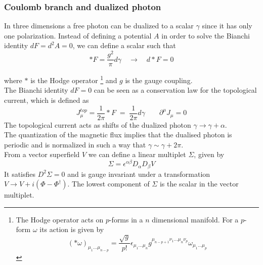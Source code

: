 \subsubsection{Coulomb branch and dualized photon	}

In three dimensions a free photon can be dualized to a scalar $\gamma$ since it has only one polarization.
Instead of defining a potential $A$ in order to solve the Bianchi identity $d F = d^2 A = 0$, we can define a scalar such that
\begin{equation}
  * F = \frac{g^2}{\pi} d  \gamma  \quad \rightarrow \quad d * F  = 0  
\end{equation} 

where 
$*$ is the Hodge operator \footnote{
  The Hodge operator acts on $p$-forms in a $n$ dimensional manifold.
  For a $p$-form $\omega$ its action is given by 
  $$
    ( * \omega)_{\mu_1 \dots \mu_{n-p}} = \frac{\sqrt{g}}{p!} \epsilon_{\mu_1 \dots \mu_n} g^{\mu_{n-p+1} \nu_1 \dots \mu_{n} \nu_p } \omega_{\mu_1 \dots \mu_p}
  $$
}
and 
$g$ is the gauge coupling.\\
The Bianchi identity $d F = 0$ can be seen as a conservation law for the topological current, which is defined as
\begin{equation}
 J_{\mu}^{top} = \frac{1}{2 \pi} * F \; =  \; \frac{1}{2 \pi} d \gamma \qquad \partial^{\mu} J_{\mu} =0
\end{equation}
The topological current acts as shifts of the dualized photon $\gamma \rightarrow \gamma + \alpha$.\\
The quantization of the magnetic flux implies that the dualised photon is periodic and is normalized in such a way that $\gamma \sim \gamma + 2 \pi$.
\\
From a vector superfield $V$ we can define a linear multiplet $\Sigma$, given by
\begin{equation}
 \Sigma = \epsilon^{\alpha \beta} D_{\alpha} D_{\beta} V
 \label{eqn:linear_multiplet_gauge}
\end{equation}
It satisfies $D^2 \Sigma = 0$ and is gauge invariant under a transformation $V \rightarrow V + i (\Phi - \Phi^{\dagger})$.
The lowest component of $\Sigma$ is the scalar in the vector multiplet.
